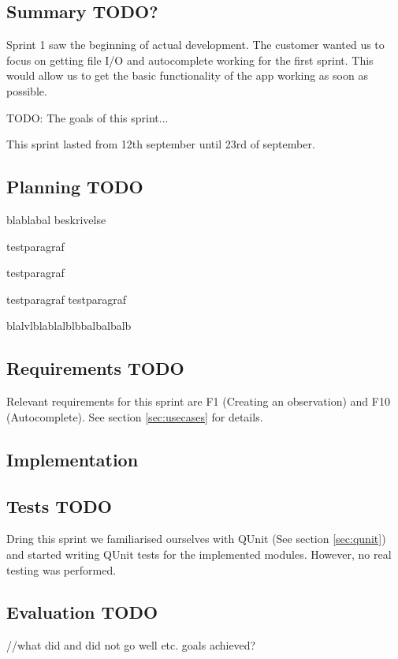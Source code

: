 \subsection{Summary TODO?}

	Sprint 1 saw the beginning of actual development. The customer wanted us to focus on getting file I/O and autocomplete working for the first sprint. This would allow us to get the basic functionality of the app working as soon as possible.
	
	TODO:
	The goals of this sprint...

	This sprint lasted from 12th september until 23rd of september.
 
\subsection{Planning TODO}
	blablabal beskrivelse

testparagraf

testparagraf

testparagraf testparagraf

blalvlblablalblbbalbalbalb

	

\subsection{Requirements TODO}

	Relevant requirements for this sprint are F1 (Creating an observation) and F10 (Autocomplete). See section \ref{sec:usecases} for details.


\subsection{Implementation}

	

\subsection{Tests TODO}
	Dring this sprint we familiarised ourselves with QUnit (See section \ref{sec:qunit}) and started writing QUnit tests for the implemented modules. However, no real testing was performed.

\subsection{Evaluation TODO}
	//what did and did not go well etc. goals achieved?